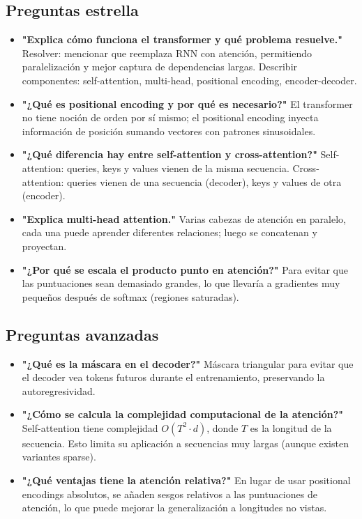 \documentclass[12pt,a4paper,openany,oneside]{book}
\begin{document}
\subsection{Preguntas estrella}
\begin{itemize}
    \item \textbf{"Explica cómo funciona el transformer y qué problema resuelve."}
    Resolver: mencionar que reemplaza RNN con atención, permitiendo paralelización y mejor captura de dependencias largas. Describir componentes: self-attention, multi-head, positional encoding, encoder-decoder.
    
    \item \textbf{"¿Qué es positional encoding y por qué es necesario?"}
    El transformer no tiene noción de orden por sí mismo; el positional encoding inyecta información de posición sumando vectores con patrones sinusoidales.
    
    \item \textbf{"¿Qué diferencia hay entre self-attention y cross-attention?"}
    Self-attention: queries, keys y values vienen de la misma secuencia. Cross-attention: queries vienen de una secuencia (decoder), keys y values de otra (encoder).
    
    \item \textbf{"Explica multi-head attention."}
    Varias cabezas de atención en paralelo, cada una puede aprender diferentes relaciones; luego se concatenan y proyectan.
    
    \item \textbf{"¿Por qué se escala el producto punto en atención?"}
    Para evitar que las puntuaciones sean demasiado grandes, lo que llevaría a gradientes muy pequeños después de softmax (regiones saturadas).
\end{itemize}

\subsection{Preguntas avanzadas}
\begin{itemize}
    \item \textbf{"¿Qué es la máscara en el decoder?"}
    Máscara triangular para evitar que el decoder vea tokens futuros durante el entrenamiento, preservando la autoregresividad.
    
    \item \textbf{"¿Cómo se calcula la complejidad computacional de la atención?"}
    Self-attention tiene complejidad \(O(T^2 \cdot d)\), donde \(T\) es la longitud de la secuencia. Esto limita su aplicación a secuencias muy largas (aunque existen variantes sparse).
    
    \item \textbf{"¿Qué ventajas tiene la atención relativa?"}
    En lugar de usar positional encodings absolutos, se añaden sesgos relativos a las puntuaciones de atención, lo que puede mejorar la generalización a longitudes no vistas.
\end{itemize}
\end{document}
